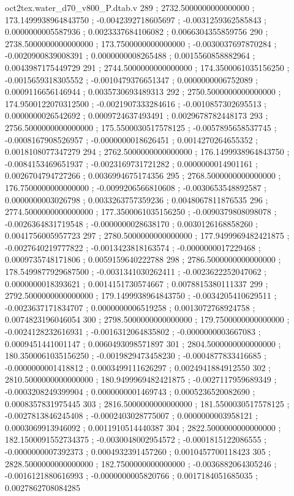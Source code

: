 \begin{filecontents}[overwrite]{oct2tex.water_d70_v800_P.dtab.v}
289 ; 2732.5000000000000000 ; 173.1499938964843750 ; -0.0042392718605697 ; -0.0031259362585843 ; 0.0000000005587936 ; 0.0023337684106082 ; 0.0066304355859756
290 ; 2738.5000000000000000 ; 173.7500000000000000 ; -0.0030037697870284 ; -0.0020900839008391 ; 0.0000000008265488 ; 0.0015560858882964 ; 0.0043987175449729
291 ; 2744.5000000000000000 ; 174.3500061035156250 ; -0.0015659318305552 ; -0.0010479376651347 ; 0.0000000006752089 ; 0.0009116656146944 ; 0.0035730693489313
292 ; 2750.5000000000000000 ; 174.9500122070312500 ; -0.0021907333284616 ; -0.0010857302695513 ; 0.0000000026542692 ; 0.0009724637493491 ; 0.0029678782448173
293 ; 2756.5000000000000000 ; 175.5500030517578125 ; -0.0057895658537745 ; -0.0008167908526957 ; -0.0000000018626451 ; 0.0014270264655352 ; 0.0018108077347279
294 ; 2762.5000000000000000 ; 176.1499938964843750 ; -0.0084153469651937 ; -0.0023169731721282 ; 0.0000000014901161 ; 0.0026704794727266 ; 0.0036994675174356
295 ; 2768.5000000000000000 ; 176.7500000000000000 ; -0.0099206566810608 ; -0.0030653548892587 ; 0.0000000003026798 ; 0.0033263757359236 ; 0.0048067811876535
296 ; 2774.5000000000000000 ; 177.3500061035156250 ; -0.0090379808098078 ; -0.0026364831719548 ; -0.0000000028638170 ; 0.0030126168858260 ; 0.0041756005957723
297 ; 2780.5000000000000000 ; 177.9499969482421875 ; -0.0027640219777822 ; -0.0013423818163574 ; -0.0000000017229468 ; 0.0009735748171806 ; 0.0059159640222788
298 ; 2786.5000000000000000 ; 178.5499877929687500 ; -0.0031341030262411 ; -0.0023622252047062 ; 0.0000000018393621 ; 0.0014151730574667 ; 0.0078815380111337
299 ; 2792.5000000000000000 ; 179.1499938964843750 ; -0.0034205410629511 ; -0.0023637171834707 ; 0.0000000006519258 ; 0.0013072768924758 ; 0.0074823196046054
300 ; 2798.5000000000000000 ; 179.7500000000000000 ; -0.0024128232616931 ; -0.0016312064835802 ; -0.0000000003667083 ; 0.0009451441001147 ; 0.0060493098571897
301 ; 2804.5000000000000000 ; 180.3500061035156250 ; -0.0019829473458230 ; -0.0004877833416685 ; -0.0000000001418812 ; 0.0003499111626297 ; 0.0024941884912550
302 ; 2810.5000000000000000 ; 180.9499969482421875 ; -0.0027117959689349 ; -0.0003208249399904 ; 0.0000000001469743 ; 0.0005236520082690 ; 0.0008357831975445
303 ; 2816.5000000000000000 ; 181.5500030517578125 ; -0.0027813846245408 ; -0.0002403028775007 ; 0.0000000003958121 ; 0.0003069913946092 ; 0.0011910514440387
304 ; 2822.5000000000000000 ; 182.1500091552734375 ; -0.0030048002954572 ; -0.0001815122086555 ; -0.0000000007392373 ; 0.0004932391457260 ; 0.0010457700118423
305 ; 2828.5000000000000000 ; 182.7500000000000000 ; -0.0036882064305246 ; -0.0016121880616993 ; -0.0000000005820766 ; 0.0017184051685035 ; 0.0027862708084285

\end{filecontents}
